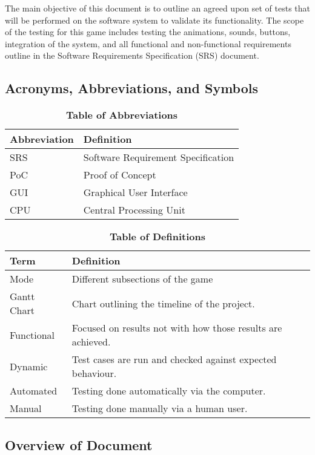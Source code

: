 \documentclass[12pt, titlepage]{article}
\begin{document}
\par The main objective of this document is to outline an agreed upon set of tests that will be performed on the software system to validate its functionality. The scope of the testing for this game includes testing the animations, sounds, buttons, integration of the system, and all functional and non-functional requirements outline in the Software Requirements Specification (SRS) document.


\subsection{Acronyms, Abbreviations, and Symbols}
	
\begin{table}[hbp]
\caption{\textbf{Table of Abbreviations}} \label{Table}
\begin{tabularx}{\textwidth}{p{3cm}X}
\toprule
\textbf{Abbreviation} & \textbf{Definition} \\
\midrule
SRS & Software Requirement Specification\\
PoC & Proof of Concept\\
GUI & Graphical User Interface\\
CPU & Central Processing Unit\\
\bottomrule
\end{tabularx}
\end{table}


\begin{table}[!htbp]
\caption{\textbf{Table of Definitions}} \label{Table}
\begin{tabularx}{\textwidth}{p{3cm}X}
\toprule
\textbf{Term} & \textbf{Definition}\\
\midrule
Mode & Different subsections of the game\\
Gantt Chart & Chart outlining the timeline of the project.\\
Functional  & Focused on results not with how those results are achieved. \\
Dynamic  & Test cases are run and checked against expected behaviour. \\
Automated  & Testing done automatically via the computer.\\ 
Manual  & Testing done manually via a human user. \\
\bottomrule
\end{tabularx}
\end{table}	
\subsection{Overview of Document}
\end{document}
